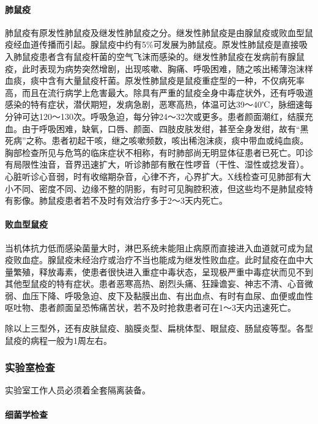 \paragraph{肺鼠疫}

肺鼠疫有原发性肺鼠疫及继发性肺鼠疫之分。继发性肺鼠疫是由腺鼠疫或败血型鼠疫经血道传播而引起。腺鼠疫中约有5\%可发展为肺鼠疫。原发性肺鼠疫是直接吸入肺鼠疫患者含有鼠疫杆菌的空气飞沫而感染的。继发性肺鼠疫在发病前有腺鼠疫，此时表现为病势突然增剧，出现咳嗽、胸痛、呼吸困难，随之咳出稀薄泡沫样血痰，痰中含有大量鼠疫杆菌。原发性肺鼠疫是鼠疫重症型的一种，不仅病死率高，而且在流行病学上危害最大。除具有严重的鼠疫全身中毒症状外，还有呼吸道感染的特有症状，潜伏期短，发病急剧，恶寒高热，体温可达39～40℃，脉细速每分钟可达120～130次。呼吸急迫，每分钟24～32次或更多。患者颜面潮红，结膜充血。由于呼吸困难，缺氧，口唇、颜面、四肢皮肤发绀，甚至全身发绀，故有“黑死病”之称。患者初起干咳，继之咳嗽频数，咳出稀泡沫痰，痰中带血或纯血痰。胸部检查所见与危笃的临床症状不相称，有时肺部尚无明显体征患者已死亡。叩诊有局限性浊音，音界迅速扩大，听诊肺部有散在性啰音（干性、湿性或捻发音）。心脏听诊心音弱，时有收缩期杂音，心律不齐，心界扩大。X线检查可见肺部有大小不同、密度不同、边缘不整的阴影，有时可见胸腔积液，但这些均不是肺鼠疫特有影像。肺鼠疫患者若不及时有效治疗多于2～3天内死亡。

\paragraph{败血型鼠疫}

当机体抗力低而感染菌量大时，淋巴系统未能阻止病原而直接进入血道就可成为鼠疫败血症。腺鼠疫未经治疗或治疗不当也能成为继发性败血症。此时鼠疫在血中大量繁殖，释放毒素，使患者很快进入重症中毒状态，呈现极严重中毒症状而见不到其他型鼠疫的特有症状。患者恶寒高热、剧烈头痛、狂躁谵妄、神志不清、心音微弱、血压下降、呼吸急迫、皮下及黏膜出血、有出血点、有时有血尿、血便或血性呕吐物、患者颜面呈恐怖痛苦状，若不及时抢救患者可在1～3天内迅速死亡。

除以上三型外，还有皮肤鼠疫、脑膜炎型、扁桃体型、眼鼠疫、肠鼠疫等型。各型鼠疫的病程一般为1周左右。

\subsubsection{实验室检查}

实验室工作人员必须着全套隔离装备。

\paragraph{细菌学检查}

